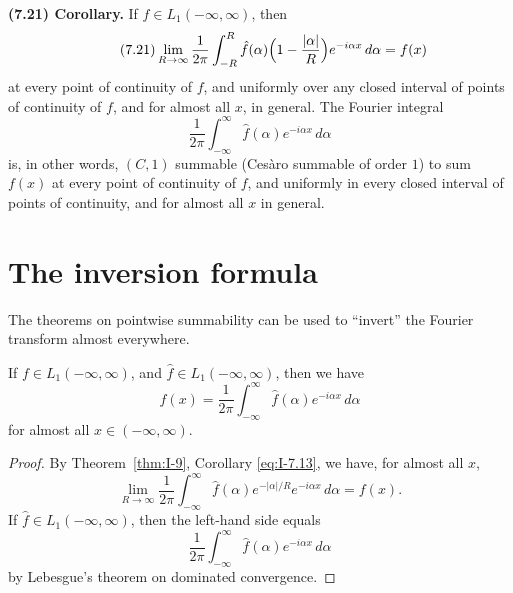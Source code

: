 \noindent\textbf{(7.21) Corollary.}
If $f\in L_1(-\infty,\infty)$, then
\begin{equation}\label{eq:I-7.21}\tag{7.21}
\lim_{R\to\infty}\frac{1}{2\pi}\int_{-R}^{R}\hat f(\alpha)\Bigl(1-\frac{|\alpha|}{R}\Bigr)e^{-i\alpha x}\,d\alpha=f(x)
\end{equation}
at every point of continuity of $f$, and uniformly over any closed interval of points of continuity of $f$, and for almost all $x$, in general. The Fourier integral
\begin{equation*}
\frac{1}{2\pi}\int_{-\infty}^{\infty}\hat f(\alpha)e^{-i\alpha x}\,d\alpha
\end{equation*}
is, in other words, $(C,1)$ summable (Ces\`aro summable of order $1$) to sum $f(x)$ at every point of continuity of $f$, and uniformly in every closed interval of points of continuity, and for almost all $x$ in general.

\section{The inversion formula}
\label{sec:I-8}

The theorems on pointwise summability can be used to ``invert'' the Fourier transform almost everywhere.

\begin{theorem}\label{thm:I-11}
If $f\in L_1(-\infty,\infty)$, and $\widehat f\in L_1(-\infty,\infty)$, then we have
\begin{equation*}
f(x)=\frac{1}{2\pi}\int_{-\infty}^{\infty}\widehat f(\alpha)e^{-i\alpha x}\,d\alpha
\end{equation*}
for almost all $x\in(-\infty,\infty)$.
\end{theorem}

\begin{proof}
By Theorem~\ref{thm:I-9}, Corollary \eqref{eq:I-7.13}, we have, for almost all $x$,
\begin{equation*}
\lim_{R\to\infty}\frac{1}{2\pi}\int_{-\infty}^{\infty}\widehat f(\alpha)e^{-|\alpha|/R}e^{-i\alpha x}\,d\alpha=f(x).
\end{equation*}
If $\widehat f\in L_1(-\infty,\infty)$, then the left-hand side equals
\begin{equation*}
\frac{1}{2\pi}\int_{-\infty}^{\infty}\widehat f(\alpha)e^{-i\alpha x}\,d\alpha
\end{equation*}
by Lebesgue's theorem on dominated convergence.
\end{proof}

